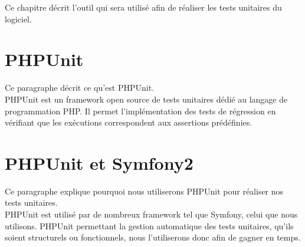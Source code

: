 	Ce chapitre décrit l'outil qui sera utilisé afin de réaliser les tests unitaires du logiciel.
	
\section{PHPUnit}
	Ce paragraphe décrit ce qu'est PHPUnit. \\
	
	PHPUnit est un framework open source de tests unitaires dédié au langage de programmation PHP. Il permet l'implémentation des tests de régression en vérifiant que les exécutions correspondent aux assertions prédéfinies.
	
\section{PHPUnit et Symfony2}
	Ce paragraphe explique pourquoi nous utiliserons PHPUnit pour réaliser nos tests unitaires. \\
	
	PHPUnit est utilisé par de nombreux framework tel que Symfony, celui que nous utilisons. PHPUnit permettant la gestion automatique des tests unitaires, qu'ils soient structurels ou fonctionnels, nous l'utiliserons donc afin de gagner en temps.
	